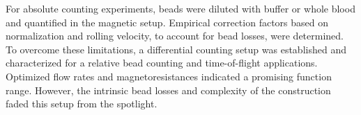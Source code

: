 For absolute counting experiments, beads were diluted with buffer or whole blood and quantified in the magnetic setup. Empirical correction factors based on normalization and rolling velocity, to account for bead losses, were determined. To overcome these limitations, a differential counting setup was established and characterized for a relative bead counting and time-of-flight applications. Optimized flow rates and magnetoresistances indicated a promising function range. However, the intrinsic bead losses and complexity of the construction faded this setup from the spotlight.



